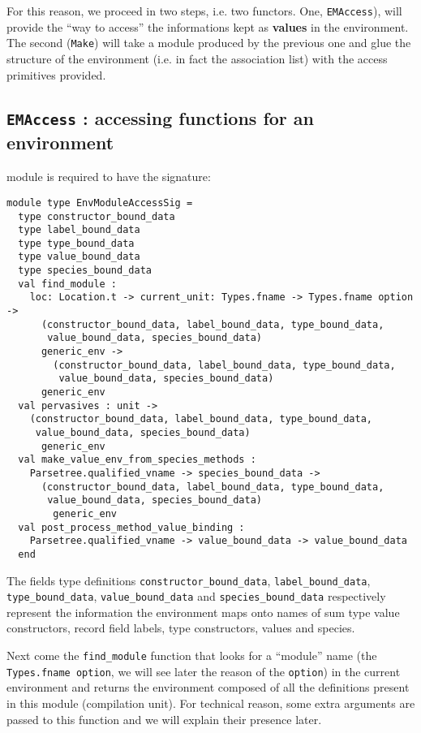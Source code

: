 \medskip
For this reason, we proceed in two steps, i.e. two functors. One,
{\tt EMAccess}), will provide the ``way to access'' the informations
kept as {\bf values} in the environment. The second ({\tt Make}) will
take a module produced by the previous one and glue the structure of
the environment (i.e. in fact the association list) with the access
primitives provided.

\subsection{{\tt EMAccess} : accessing functions for an environment}
module is required to have the signature:
{\scriptsize
\begin{lstlisting}[language=MyOCaml]
module type EnvModuleAccessSig =
  type constructor_bound_data
  type label_bound_data
  type type_bound_data
  type value_bound_data
  type species_bound_data
  val find_module :
    loc: Location.t -> current_unit: Types.fname -> Types.fname option ->
      (constructor_bound_data, label_bound_data, type_bound_data,
       value_bound_data, species_bound_data)
      generic_env ->
        (constructor_bound_data, label_bound_data, type_bound_data,
         value_bound_data, species_bound_data)
      generic_env
  val pervasives : unit ->
    (constructor_bound_data, label_bound_data, type_bound_data,
     value_bound_data, species_bound_data)
      generic_env
  val make_value_env_from_species_methods :
    Parsetree.qualified_vname -> species_bound_data ->
      (constructor_bound_data, label_bound_data, type_bound_data,
       value_bound_data, species_bound_data)
        generic_env
  val post_process_method_value_binding :
    Parsetree.qualified_vname -> value_bound_data -> value_bound_data
  end
\end{lstlisting}
}

\medskip
The fields type definitions {\tt constructor\_bound\_data},
{\tt label\_bound\_data}, {\tt type\_bound\_data}, {\tt value\_bound\_data}
and {\tt species\_bound\_data} respectively represent the information the
environment maps onto names of sum type value constructors, record
field labels, type constructors, values and species.

\medskip
Next come the {\tt find\_module} function that looks for a ``module''
name (the {\tt Types.fname option}, we will see later the reason of
the {\tt option}) in the current environment and returns the
environment composed of all the definitions present in this module
(compilation unit). For technical reason, some extra arguments are
passed to this function and we will explain their presence later.


